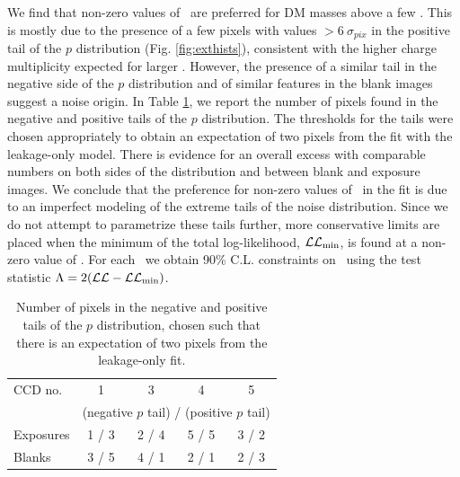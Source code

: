 \documentclass[aps,amsmath,amssymb,twocolumn,superscriptaddress,nofootinbib]{revtex4-1}
\begin{document}
We find that non-zero values of \sige\ are preferred for DM masses above a few \mevm. %
This is mostly due to the presence of a few pixels with values $>6~\sigma_{pix}$ in the positive tail of the $p$ distribution (Fig. \ref{fig:exthists}), consistent with the higher charge multiplicity expected for larger \mass. However, the presence of a similar tail in the negative side of the $p$ distribution and of similar features in the blank images suggest a noise origin. In Table \ref{tab:pval}, we report the number of pixels found in the negative and positive tails of the $p$ distribution. The thresholds for the tails were chosen appropriately to obtain an expectation of two pixels from the fit with the leakage-only model. There is evidence for an overall excess with comparable numbers on both sides of the distribution and between blank and exposure images.  We conclude that the preference for non-zero values of \sige\ in the fit is due to an imperfect modeling of the extreme tails of the noise distribution. 
Since we do not attempt to parametrize these tails further, more conservative limits are placed when the minimum of the total log-likelihood, $\mathcal{LL_{\rm min}}$, is found at a non-zero value of \sige. For each \mass\ we obtain 90\% C.L. constraints on \sige\ using the test statistic $\Lambda=2(\mathcal{LL}-\mathcal{LL_{\rm min})}$.%

\begin{table}[h!]
\centering
\caption{\label{tab:pval} 
Number of pixels in the negative and positive tails of the $p$ distribution, chosen such that there is an expectation of two pixels from the leakage-only fit.}
\begin{ruledtabular}
\begin{tabular}{lcccc}
CCD no.  & 1 & 3 & 4 & 5 \\
& \multicolumn{4}{c}{(negative $p$ tail) / (positive $p$ tail)} \\
\hline
Exposures &  1 / 3 & 2 / 4 & 5 / 5 & 3 / 2
\\
Blanks & 3 / 5 & 4 / 1 & 2 / 1 & 2 / 3
\\
\end{tabular}
\end{ruledtabular}
\end{table}
\end{document}
